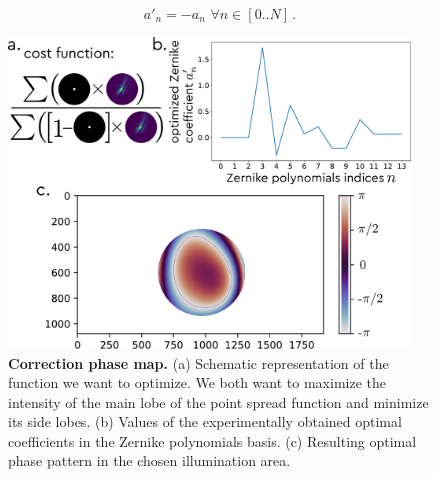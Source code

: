 \documentclass[12pt]{iopart}
\begin{document}
\begin{equation}
  a'_n = -a_n \,\, \forall n \in [0..N]\, .
\end{equation}

\begin{figure}
  \centering
  \includegraphics[width = 0.95\textwidth]{images/Zernike_1.pdf}
  \caption{
    \textbf{Correction phase map.}
    (a) Schematic representation of the function we want to optimize.
    We both want to maximize the intensity of the main lobe of the point spread function
    and minimize its side lobes.
    (b) Values of the experimentally obtained optimal coefficients in the Zernike polynomials basis.
    (c) Resulting optimal phase pattern in the chosen illumination area.
  }
  \label{fig:phase_corr}
\end{figure}
\end{document}
